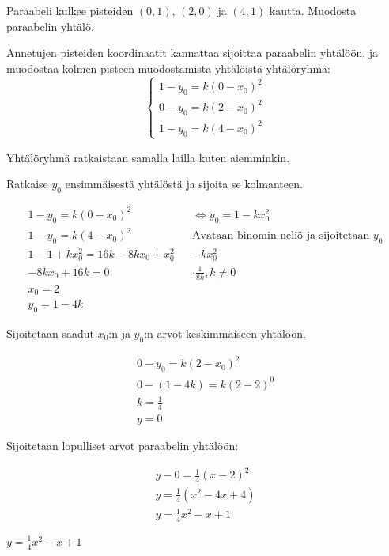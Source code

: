 \begin{esimerkki}
	Paraabeli kulkee pisteiden $(0,1)$, $(2,0)$ ja $(4,1)$ kautta. Muodosta paraabelin yhtälö.
	
	\begin{esimratk} 
		Annetujen pisteiden koordinaatit kannattaa sijoittaa paraabelin yhtälöön, ja muodostaa kolmen pisteen muodostamista yhtälöistä yhtälöryhmä:
\[
\left\{
\begin{aligned}
1 - y_0 = k(0 - x_0)^2 \\
0 - y_0 = k(2 - x_0)^2 \\
1 - y_0 = k(4 - x_0)^2
\end{aligned}
\right.
\]

		Yhtälöryhmä ratkaistaan samalla lailla kuten aiemminkin.
		
		Ratkaise $y_0$ ensimmäisestä yhtälöstä ja sijoita se kolmanteen.


\begin{align*}
	1 - y_0 = k(0 - x_0)^2 && \Leftrightarrow y_0 = 1- kx^2_0  \\
	1-y_0=k(4-x_0)^2 && \text{Avataan binomin neliö ja sijoitetaan }y_0 \\
	1-1+kx^2_0 = 16k - 8kx_0 + x^2_0 && -kx^2_0 \\
	-8kx_0 + 16k = 0 && \cdot \frac{1}{8k}, k \neq 0 \\
	x_0 = 2 \\
	y_0 = 1 - 4k	
\end{align*}	

		 Sijoitetaan saadut $x_0$:n ja $y_0$:n arvot keskimmäiseen yhtälöön.

\begin{align*}	
	0 - y_0 = k(2 - x_0)^2 \\
	0 - (1 - 4k) = k(2-2)^0 \\
	k = \frac{1}{4} \\
	y = 0
\end{align*}

		Sijoitetaan lopulliset arvot paraabelin yhtälöön:

\begin{align*}	
	y - 0 = \frac{1}{4}(x-2)^2 \\
	y = \frac{1}{4}(x^2-4x+4) \\
	y = \frac{1}{4}x^2 - x + 1
\end{align*}


		\begin{esimvast}
			$y=\frac{1}{4}x^2 - x + 1$
		\end{esimvast}


	\end{esimratk}
\end{esimerkki}




